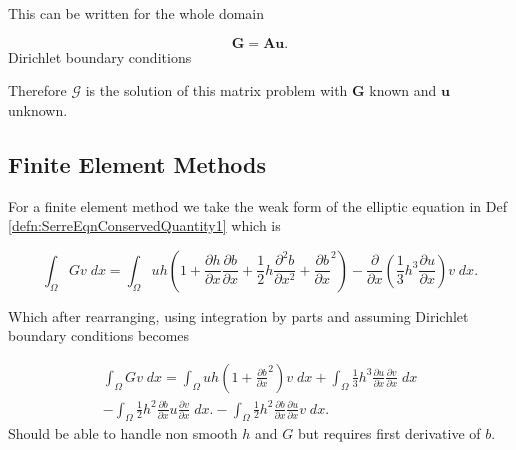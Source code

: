 This can be written for the whole domain 

\begin{equation*}
\boldsymbol{G} = \boldsymbol{A}
\boldsymbol{u}.
\end{equation*}
Dirichlet boundary conditions

Therefore $\mathcal{G}$ is the solution of this matrix problem with $\boldsymbol{G}$ known and $\boldsymbol{u}$ unknown. 

\subsection{Finite Element Methods}
For a finite element method we take the weak form of the elliptic equation in Def \ref{defn:SerreEqnConservedQuantity1} which is 

	\[ \int_{\Omega } G v \; dx =  \int_{\Omega } uh \left(1 + \frac{\partial h}{\partial x}\frac{\partial b}{\partial x} + \frac{1}{2}h\frac{\partial^2 b}{\partial x^2} + \frac{\partial b}{\partial x}^2 \right) - \frac{\partial}{\partial x}\left(\frac{1}{3}h^3  \frac{\partial {u}}{\partial x}\right) v \; dx.\]
	
Which after rearranging, using integration by parts and assuming Dirichlet boundary conditions becomes



\begin{multline}
\int_{\Omega } G v \; dx = \int_{\Omega } uh \left(1 + \frac{\partial b}{\partial x}^2 \right) v \; dx +  \int_{\Omega } \frac{1}{3}h^3  \frac{\partial {u}}{\partial x} \frac{\partial v}{\partial x} \; dx  \\ - 
\int_{\Omega }   \frac{1}{2}h^2\frac{\partial b}{\partial x} u \frac{\partial v }{\partial x}\; dx. - 
\int_{\Omega }   \frac{1}{2}h^2\frac{\partial b}{\partial x}  \frac{\partial u }{\partial x}v \; dx.
\end{multline}
Should be able to handle non smooth $h$ and $G$ but requires first derivative of $b$.

